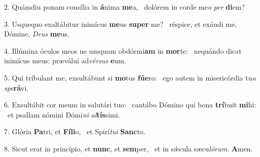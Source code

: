 2. Quámdiu ponam consília in \textbf{á}nima \textbf{me}a, \ast\  dolórem in corde me\textit{o} \textit{per} \textbf{di}em?\

3. Usquequo exaltábitur inimícus \textbf{me}us \textbf{su}\textbf{per} me? \ast\  réspice, et exáudi me, Dómine, \textit{De}\textit{us} \textbf{me}us.\

4. Illúmina óculos meos ne umquam obdórmi\textbf{am} in \textbf{mor}te: \ast\  nequándo dicat inimícus meus: præválui ad\textit{vér}\textit{sus} \textbf{e}um.\

5. Qui tríbulant me, exsultábunt si \textbf{mo}tus \textbf{fú}\textbf{e}ro: \ast\  ego autem in misericórdia tu\textit{a} \textit{spe}\textbf{rá}vi.\

6. Exsultábit cor meum in salutári tuo: \dag\  cantábo Dómino qui bona \textbf{trí}buit \textbf{mi}hi: \ast\  et psallam nómini Dómi\textit{ni} \textit{al}\textbf{tís}simi.\

7. Glória \textbf{Pa}tri, et \textbf{Fí}\textbf{li}o, \ast\  et Spirí\textit{tu}\textit{i} \textbf{Sanc}to.\

8. Sicut erat in princípio, et \textbf{nunc}, et \textbf{sem}per, \ast\  et in sǽcula sæcu\textit{ló}\textit{rum}. \textbf{A}men.\


